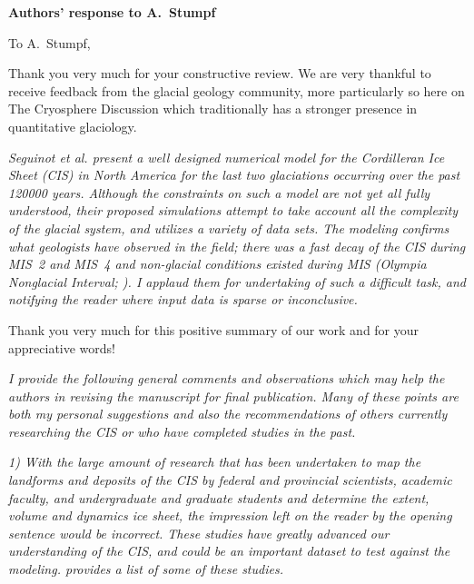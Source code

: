 


\textbf{Authors' response to A.~Stumpf}
\bigskip


\newcommand{\sechead}[1]{\bigskip\noindent\textbf{#1}}
\newcommand{\referee}[1]{\bigskip\textcolor{journalname}{\textit{#1}}}
\newcommand{\msquote}[1]{\begin{quote}\textit{#1}\end{quote}}

To A.~Stumpf,

Thank you very much for your constructive review.
We are very thankful to receive feedback from the glacial geology community,
more particularly so here on The Cryosphere Discussion which traditionally
has a stronger presence in quantitative glaciology.

\referee{%
    Seguinot et al. present a well designed numerical model for the Cordilleran
    Ice Sheet (CIS) in North America for the last two glaciations occurring
    over the past 120000 years. Although the constraints on such a model are
    not yet all fully understood, their proposed simulations attempt to take
    account all the complexity of the glacial system, and utilizes a variety of
    data sets. The modeling confirms what geologists have observed in the
    field; there was a fast decay of the CIS during MIS~2 and MIS~4 and
    non-glacial conditions existed during MIS (Olympia Nonglacial Interval;
    \citealp[e.g.,][]{Plouffe.Jette.1997}). I applaud them for undertaking of
    such a difficult task, and notifying the reader where input data is sparse
    or inconclusive.}

Thank you very much for this positive summary of our work and for your
appreciative words!

\referee{%
    I provide the following general comments and observations which may help
    the authors in revising the manuscript for final publication. Many of these
    points are both my personal suggestions and also the recommendations of
    others currently researching the CIS or who have completed studies in the
    past.}

\referee{%
    1) With the large amount of research that has been undertaken to map the
    landforms and deposits of the CIS by federal and provincial scientists,
    academic faculty, and undergraduate and graduate students and determine the
    extent, volume and dynamics ice sheet, the impression left on the reader by
    the opening sentence would be incorrect. These studies have greatly
    advanced our understanding of the CIS, and could be an important dataset to
    test against the modeling. \citet{Stumpf.etal.2014} provides a list of some
    of these studies.}

